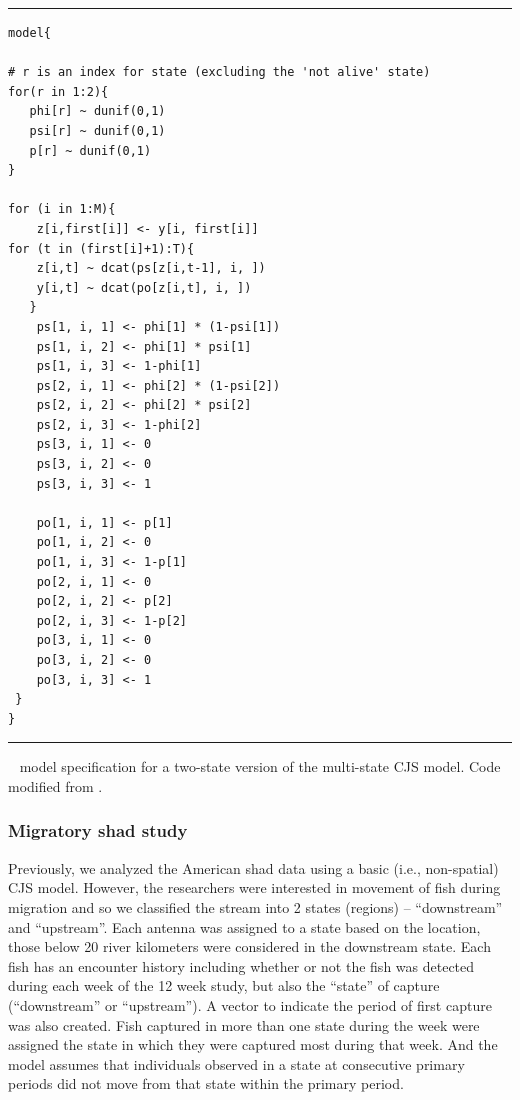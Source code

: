 \begin{panel}[htp]
\centering
\rule[0.1in]{\textwidth}{.03in}
{\small
\begin{verbatim}
model{

# r is an index for state (excluding the 'not alive' state)
for(r in 1:2){
   phi[r] ~ dunif(0,1)
   psi[r] ~ dunif(0,1)
   p[r] ~ dunif(0,1)
}    

for (i in 1:M){
    z[i,first[i]] <- y[i, first[i]]
for (t in (first[i]+1):T){
    z[i,t] ~ dcat(ps[z[i,t-1], i, ])
    y[i,t] ~ dcat(po[z[i,t], i, ])
   }
	ps[1, i, 1] <- phi[1] * (1-psi[1])
	ps[1, i, 2] <- phi[1] * psi[1]
	ps[1, i, 3] <- 1-phi[1]
	ps[2, i, 1] <- phi[2] * (1-psi[2])
	ps[2, i, 2] <- phi[2] * psi[2]
	ps[2, i, 3] <- 1-phi[2]
	ps[3, i, 1] <- 0
	ps[3, i, 2] <- 0
	ps[3, i, 3] <- 1

	po[1, i, 1] <- p[1]
	po[1, i, 2] <- 0
	po[1, i, 3] <- 1-p[1]
	po[2, i, 1] <- 0
	po[2, i, 2] <- p[2]
	po[2, i, 3] <- 1-p[2]
	po[3, i, 1] <- 0
	po[3, i, 2] <- 0
	po[3, i, 3] <- 1
 }
}
\end{verbatim}
}
\rule[-0.1in]{\textwidth}{.03in}
\caption{
\jags~ model specification for a two-state version of the multi-state
CJS model. Code modified 
from \cite[][Chapt. 9]{kery_schaub:2011}. }
\label{open.panel.msCJS}
\end{panel}

\subsubsection{Migratory shad study}

Previously, we analyzed the American shad data using a basic (i.e., non-spatial) CJS
model.  However, the researchers were interested in movement of fish
during migration and so we classified the stream into 2 states
(regions) -- ``downstream'' and ``upstream''.  Each antenna was assigned
to a state based on the location, those below 20 river kilometers were
considered in the downstream state.  Each fish has an encounter
history including whether or not the fish was detected during each
week of the 12 week study, but also the ``state'' of capture
(``downstream'' or ``upstream'').  A vector to indicate the
period of first capture was also created.  Fish captured in more than
one state during the week were assigned the state in which they were
captured most during that week.  And the model assumes that individuals 
observed in a state at consecutive primary periods did not move from that state
within the primary period.

